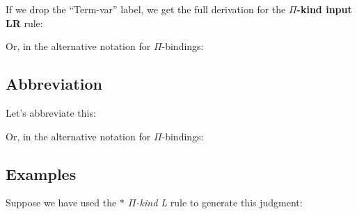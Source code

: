 \documentclass{book}
\numberwithin{equation}{chapter}
\newcommand{\vocab}{\textbf}
\begin{document}
\noindent
If we drop the ``Term-var'' label, we get the full derivation for the \vocab{$\Pi$-kind input LR} rule:

\begin{prooftree}
\end{prooftree}

\noindent
Or, in the alternative notation for $\Pi$-bindings:

\begin{prooftree}
\end{prooftree}


\subsection{Abbreviation}

Let's abbreviate this:

\begin{prooftree}
\end{prooftree}

Or, in the alternative notation for $\Pi$-bindings:

\begin{prooftree}
\end{prooftree}


\subsection{Examples}

Suppose we have used the \textit{$\ast$ $\Pi$-kind L} rule to generate this judgment:

\begin{prooftree}
\end{prooftree}
\end{document}
